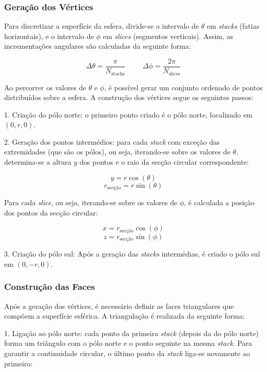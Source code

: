 \documentclass[12pt, a4paper]{article}
\begin{document}
\subsubsection{Geração dos Vértices}

Para discretizar a superfície da esfera, divide-se o intervalo de $\theta$ em \emph{stacks} (fatias
horizontais), e o intervalo de $\phi$ em \emph{slices} (segmentos verticais). Assim, as
incrementações angulares são calculadas da seguinte forma:

$$
\Delta\theta = \frac{\pi}{N_\text{stacks}}
\hspace{1cm}
\Delta\phi = \frac{2\pi}{N_\text{slices}}
$$

Ao percorrer os valores de $\theta$ e $\phi$, é possível gerar um conjunto ordenado de pontos
distribuídos sobre a esfera. A construção dos vértices segue os seguintes passos:

1. Criação do pólo norte: o primeiro ponto criado é o pólo norte, localizado em $(0, r, 0)$.

2. Geração dos pontos intermédios: para cada \emph{stack} com exceção das extremidades (que são os
pólos), ou seja, iterando-se sobre os valores de $\theta$, determina-se a altura $y$ dos pontos e o
raio da secção circular correspondente:

$$y = r \cos(\theta)$$
$$r_{\text{secção}} = r \sin(\theta)$$

Para cada \emph{slice}, ou seja, iterando-se sobre os valores de $\phi$, é calculada a posição dos
pontos da secção circular:

$$x = r_{\text{secção}} \cos(\phi)$$
$$z = r_{\text{secção}} \sin(\phi)$$


3. Criação do pólo sul: Após a geração das \emph{stacks} intermédias, é criado o pólo sul em
$(0, -r, 0)$.

\subsubsection{Construção das Faces}

Após a geração dos vértices, é necessário definir as faces triangulares que compõem a superfície
esférica. A triangulação é realizada da seguinte forma:

1. Ligação ao pólo norte: cada ponto da primeira \emph{stack} (depois da do pólo norte) forma um
triângulo com o pólo norte e o ponto seguinte na mesma \emph{stack}. Para garantir a continuidade
circular, o último ponto da \emph{stack} liga-se novamente ao primeiro:
\end{document}
